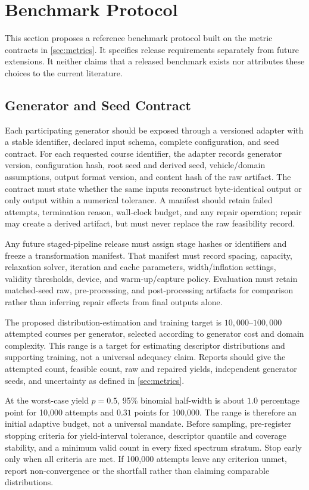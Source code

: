 \section{Benchmark Protocol}
\label{sec:benchmark-protocol}

This section proposes a reference benchmark protocol built on the metric contracts in
\cref{sec:metrics}. It specifies release requirements separately from future
extensions. It neither claims that a released benchmark exists nor attributes these
choices to the current literature.

\subsection{Generator and Seed Contract}

Each participating generator should be exposed through a versioned adapter with a
stable identifier, declared input schema, complete configuration, and seed contract.
For each requested course identifier, the adapter records generator version,
configuration hash, root seed and derived seed, vehicle/domain assumptions, output
format version, and content hash of the raw artifact. The contract must state whether
the same inputs reconstruct byte-identical output or only output within a numerical
tolerance. A manifest should retain failed attempts, termination reason, wall-clock
budget, and any repair operation; repair may create a derived artifact, but must never
replace the raw feasibility record.

Any future staged-pipeline release must assign stage hashes or identifiers and freeze
a transformation manifest.  That manifest must record spacing, capacity, relaxation
solver, iteration and cache parameters, width/inflation settings, validity thresholds,
device, and warm-up/capture policy.  Evaluation must retain matched-seed raw,
pre-processing, and post-processing artifacts for comparison rather than inferring
repair effects from final outputs alone.

The proposed distribution-estimation and training target is $10{,}000$--$100{,}000$
attempted courses per generator, selected according to generator cost and domain
complexity. This range is a target for estimating descriptor distributions and
supporting training, not a universal adequacy claim. Reports should give the attempted
count, feasible count, raw and repaired yields, independent generator seeds, and
uncertainty as defined in \cref{sec:metrics}.

At the worst-case yield $p=0.5$, 95\% binomial half-width is about $1.0$ percentage
point for 10,000 attempts and $0.31$ points for 100,000. The range is therefore an
initial adaptive budget, not a universal mandate. Before sampling, pre-register
stopping criteria for yield-interval tolerance, descriptor quantile and coverage
stability, and a minimum valid count in every fixed spectrum stratum. Stop early only
when all criteria are met. If 100,000 attempts leave any criterion unmet, report
non-convergence or the shortfall rather than claiming comparable distributions.
